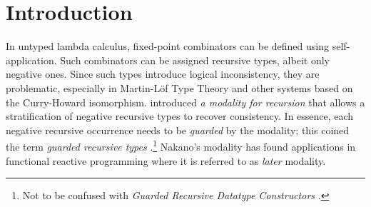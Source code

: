 
\section{Introduction}
\label{sec:intro}

In untyped lambda calculus, fixed-point combinators can be defined
using self-app\-li\-ca\-tion.  Such combinators can be assigned recursive
types, albeit only negative ones.  Since such types introduce logical
inconsistency, they are problematic, especially in Martin-L\"of
Type Theory and other systems based on the Curry-Howard isomorphism.
\citet{nakano:lics00} introduced \emph{a modality for recursion} that
allows a stratification of negative recursive types to recover
consistency.  In essence, each negative recursive occurrence needs to
be \emph{guarded} by the modality; this coined the term \emph{guarded
  recursive types} \citep{birkedalMogelberg:lics13}.\footnote{Not to
  be confused with \emph{Guarded Recursive Datatype Constructors}
  \citep{xiChenChen:popl03}.} 
Nakano's modality has found applications in functional reactive
programming \citep{krishnaswamiBenton:lics11} where it is referred to
as \emph{later} modality.


